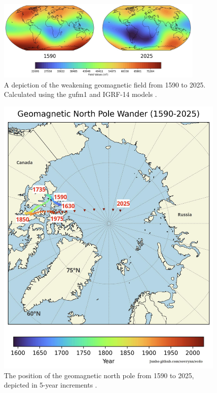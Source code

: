 \documentclass[10pt,twocolumn,letterpaper]{article}
\begin{document}
\begin{figure}[t]
\begin{center}
\includegraphics[width=0.9\textwidth]{saa.jpg}
\end{center}
   \caption{A depiction of the weakening geomagnetic field from 1590 to 2025. Calculated using the gufm1 and IGRF-14 models \cite{125,126}.}
\label{fig:14}
\end{figure}

\begin{figure}[t]
\begin{center}
   \includegraphics[width=1\linewidth]{npw.jpg}
\end{center}
   \caption{The position of the geomagnetic north pole from 1590 to 2025, depicted in 5-year increments \cite{142}.}
\label{fig:13}
\label{fig:onecol}
\end{figure}
\end{document}
